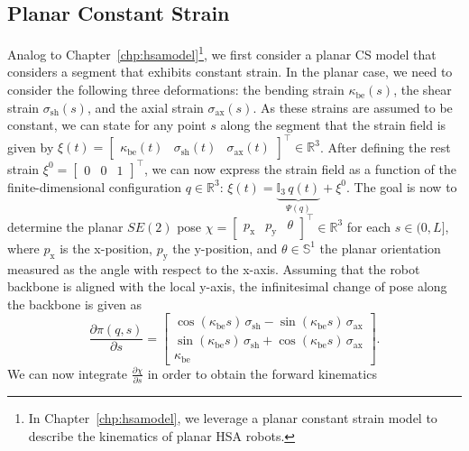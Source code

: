 \subsection{Planar Constant Strain}
Analog to Chapter~\ref{chp:hsamodel}\footnote{In Chapter~\ref{chp:hsamodel}, we leverage a planar constant strain model to describe the kinematics of planar \gls{HSA} robots.}, we first consider a planar \gls{CS} model that considers a segment that exhibits constant strain.
In the planar case, we need to consider the following three deformations: the bending strain $\kappa_\mathrm{be}(s)$, the shear strain $\sigma_\mathrm{sh}(s)$, and the axial strain $\sigma_\mathrm{ax}(s)$. As these strains are assumed to be constant, we can state for any point $s$ along the segment that the strain field is given by $\xi(t) = \begin{bmatrix}
    \kappa_\mathrm{be}(t) & \sigma_\mathrm{sh}(t) & \sigma_\mathrm{ax}(t)
\end{bmatrix}^\top \in \mathbb{R}^3$.
After defining the rest strain $\xi^0 = \begin{bmatrix}
    0 & 0 & 1
\end{bmatrix}^\top$, we can now express the strain field as a function of the finite-dimensional configuration $q \in \mathbb{R}^3$: $\xi(t) = \underbrace{\mathbb{I}_3 \, q(t)}_{\Psi(q)} + \xi^0$.
The goal is now to determine the planar $SE(2)$ pose $\chi = \begin{bmatrix}
    p_\mathrm{x} & p_\mathrm{y} & \theta
\end{bmatrix}^\top \in \mathbb{R}^3$ for each $s \in (0,L]$, where $p_\mathrm{x}$ is the x-position, $p_\mathrm{y}$ the y-position, and $\theta \in \mathbb{S}^1$ the planar orientation measured as the angle with respect to the x-axis.
Assuming that the robot backbone is aligned with the local y-axis, the infinitesimal change of pose along the backbone is given as
\begin{equation}
    \frac{\partial \pi(q,s)}{\partial s} = \begin{bmatrix}
        \cos(\kappa_\mathrm{be} s) \, \sigma_\mathrm{sh} - \sin(\kappa_\mathrm{be} s) \, \sigma_\mathrm{ax}\\
        \sin(\kappa_\mathrm{be} s) \, \sigma_\mathrm{sh} + \cos(\kappa_\mathrm{be} s) \, \sigma_\mathrm{ax}\\
        \kappa_\mathrm{be}
    \end{bmatrix}.
\end{equation}
We can now integrate $\frac{\partial \chi}{\partial s}$ in order to obtain the forward kinematics
